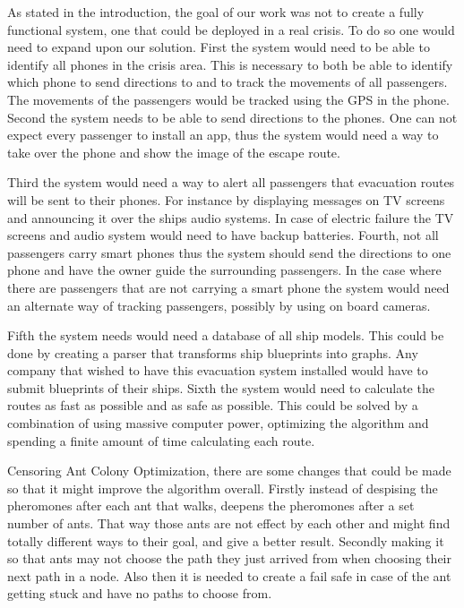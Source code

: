 As stated in the introduction, the goal of our work was not to create a fully functional system, one that could be deployed in a real crisis. To do so one would need to expand upon our solution. First the system would need to be able to identify all phones in the crisis area. This is necessary to both be able to identify which phone to send directions to and to track the movements of all passengers. The movements of the passengers would be tracked using the GPS in the phone. Second the system needs to be able to send directions to the phones. One can not expect every passenger to install an app, thus the system would need a way to take over the phone and show the image of the escape route. 

Third the system would need a way to alert all passengers that evacuation routes will be sent to their phones. For instance by displaying messages on TV screens and announcing it over the ships audio systems. In case of electric failure the TV screens and audio system would need to have backup batteries.  Fourth, not all passengers carry smart phones thus the system should send the directions to one phone and have the owner guide the surrounding passengers. In the case where there are passengers that are not carrying a smart phone the system would need an alternate way of tracking passengers, possibly by using on board cameras.

Fifth the system needs would need a database of all ship models. This could be done by creating a parser that transforms ship blueprints into graphs. Any company that wished to have this evacuation system installed would have to submit blueprints of their ships. Sixth the system would need to calculate the routes as fast as possible and as safe as possible. This could be solved by a combination of using massive computer power, optimizing the algorithm and spending a finite amount of time calculating each route.

Censoring Ant Colony Optimization, there are some changes that could be made so that it might improve the algorithm overall. Firstly instead of despising the pheromones after each ant that walks, deepens the pheromones after a set number of ants. That way those ants are not effect by each other and might find totally different ways to their goal, and give a better result. Secondly making it so that ants may not choose the path they just arrived from when choosing their next path in a node. Also then it is needed to create a fail safe in case of the ant getting stuck and have no paths to choose from.